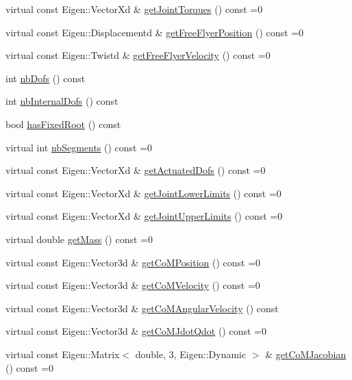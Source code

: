 \begin{DoxyCompactItemize}
virtual const Eigen\+::\+Vector\+Xd \& \hyperlink{classocra_1_1Model_a062fc08c456adf091e38ed1cfa5f0524}{get\+Joint\+Torques} () const =0
\item 
virtual const Eigen\+::\+Displacementd \& \hyperlink{classocra_1_1Model_a7549d8ca32c46a84ea4799730a81dae2}{get\+Free\+Flyer\+Position} () const =0
\item 
virtual const Eigen\+::\+Twistd \& \hyperlink{classocra_1_1Model_a0a11fff87a21ab37535420f7a7544c96}{get\+Free\+Flyer\+Velocity} () const =0
\item 
int \hyperlink{classocra_1_1Model_a804d4f0be4307d635555232f534734e9}{nb\+Dofs} () const
\item 
int \hyperlink{classocra_1_1Model_af333cdd36691a741a978bb72c004bf07}{nb\+Internal\+Dofs} () const
\item 
bool \hyperlink{classocra_1_1Model_a6f300d27fc0363c1cc6cb016e5c1d566}{has\+Fixed\+Root} () const
\item 
virtual int \hyperlink{classocra_1_1Model_acd57284b64bb5c05f4c2dac643476751}{nb\+Segments} () const =0
\item 
virtual const Eigen\+::\+Vector\+Xd \& \hyperlink{classocra_1_1Model_ad1a78d57aca4a4128c54d479f30afd82}{get\+Actuated\+Dofs} () const =0
\item 
virtual const Eigen\+::\+Vector\+Xd \& \hyperlink{classocra_1_1Model_ade47bb5ea3029b3d5652109d1ec6df7f}{get\+Joint\+Lower\+Limits} () const =0
\item 
virtual const Eigen\+::\+Vector\+Xd \& \hyperlink{classocra_1_1Model_a75caa887c8f27d8be8dc5a60ed1e1c41}{get\+Joint\+Upper\+Limits} () const =0
\item 
virtual double \hyperlink{classocra_1_1Model_a6237f96c89946f6c09be38761f128f28}{get\+Mass} () const =0
\item 
virtual const Eigen\+::\+Vector3d \& \hyperlink{classocra_1_1Model_a9c3b077772e4886299f613a71f8981e2}{get\+Co\+M\+Position} () const =0
\item 
virtual const Eigen\+::\+Vector3d \& \hyperlink{classocra_1_1Model_a567e950be5868080c250c40d8fc0c0ce}{get\+Co\+M\+Velocity} () const =0
\item 
virtual const Eigen\+::\+Vector3d \& \hyperlink{classocra_1_1Model_ac7f7c87ee1ecb19e342faaac8241de6c}{get\+Co\+M\+Angular\+Velocity} () const
\item 
virtual const Eigen\+::\+Vector3d \& \hyperlink{classocra_1_1Model_a2be9c0fdd8dbe4ecbb99eef5f4ea45d1}{get\+Co\+M\+Jdot\+Qdot} () const =0
\item 
virtual const Eigen\+::\+Matrix$<$ double, 3, Eigen\+::\+Dynamic $>$ \& \hyperlink{classocra_1_1Model_a4b148504194036b0faafe619e5b98f59}{get\+Co\+M\+Jacobian} () const =0

\end{DoxyCompactItemize}
